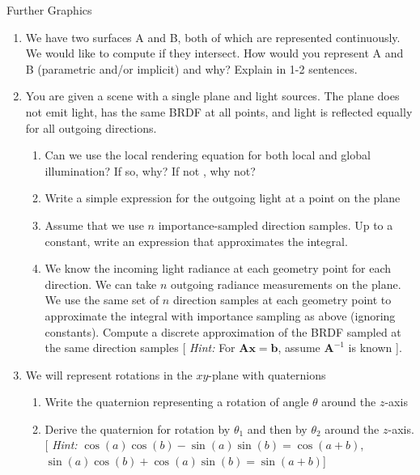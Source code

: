 \documentclass{tripos}  %
\begin{document}
\begin{question}[MockIB,year=2024,paper=1,question=4,author=rrw]{Further Graphics}


  \begin{enumerate}
    \item We have two surfaces A and B, both of which are represented continuously. We
      would like to compute if they intersect. How would you represent A and B
      (parametric and/or implicit) and why? Explain in 1-2 sentences. 
    \item You are given a scene with a single plane and light sources. The plane does not emit light, has the same BRDF at all points, and light is reflected equally for all outgoing directions.
      \begin{enumerate}
      \item Can we use the local rendering equation for both local and global illumination? If so, why? If not , why not? 
      \item Write a simple expression for the outgoing light at a point on the plane 
      \item Assume that we use $n$ importance-sampled direction samples. Up to a constant, write an expression that approximates the integral.
        \item We know the incoming light radiance at each geometry point for each direction. We can take $n$ outgoing radiance measurements on the plane.
          We use the same set of $n$ direction samples at each geometry point to approximate the integral with importance sampling as above (ignoring
          constants). Compute a discrete approximation of the BRDF sampled at the same direction samples [ {\em Hint:} For $\mathbf{A}\mathbf{x} = \mathbf{b}$, assume $\mathbf{A}^{-1}$ is known ].
      \end{enumerate}
    \item We will represent rotations in the $xy$-plane with quaternions
      \begin{enumerate}
      \item Write the quaternion representing a rotation of angle $\theta{}$ around the $z$-axis 
      \item Derive the quaternion for rotation by $\theta{}_1$ and then by $\theta{}_2$ around the $z$-axis. [ {\em Hint:}
        $\cos(a)\cos(b)-\sin(a)\sin(b) = \cos(a+b)$, $\sin(a)\cos(b)+\cos(a)\sin(b) = \sin(a+b)$] 

\end{enumerate}
\end{enumerate}
\end{question}
\end{document}
